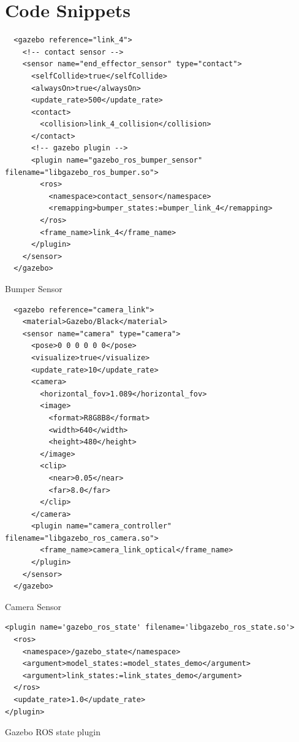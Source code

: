 \documentclass[12pt,oneside]{article}
\begin{document}
\clearpage



\appendix
\section{Code Snippets}
\begin{listing}[htbp]
\begin{verbatim} 
  <gazebo reference="link_4">
    <!-- contact sensor -->
    <sensor name="end_effector_sensor" type="contact">
      <selfCollide>true</selfCollide>
      <alwaysOn>true</alwaysOn>
      <update_rate>500</update_rate>
      <contact>
        <collision>link_4_collision</collision>
      </contact>
      <!-- gazebo plugin -->
      <plugin name="gazebo_ros_bumper_sensor" filename="libgazebo_ros_bumper.so">
        <ros>
          <namespace>contact_sensor</namespace>
          <remapping>bumper_states:=bumper_link_4</remapping>
        </ros>
        <frame_name>link_4</frame_name>
      </plugin>
    </sensor>
  </gazebo>
\end{verbatim}
\caption{Bumper Sensor}
\label{bumperSensorXml}
\end{listing}

\begin{listing}[htbp]
\begin{verbatim} 
  <gazebo reference="camera_link">
    <material>Gazebo/Black</material>
    <sensor name="camera" type="camera">
      <pose>0 0 0 0 0 0</pose>
      <visualize>true</visualize>
      <update_rate>10</update_rate>
      <camera>
        <horizontal_fov>1.089</horizontal_fov>
        <image>
          <format>R8G8B8</format>
          <width>640</width>
          <height>480</height>
        </image>
        <clip>
          <near>0.05</near>
          <far>8.0</far>
        </clip>
      </camera>
      <plugin name="camera_controller" filename="libgazebo_ros_camera.so">
        <frame_name>camera_link_optical</frame_name>
      </plugin>
    </sensor>
  </gazebo>
\end{verbatim}
\caption{Camera Sensor}
\label{cameraSensorXml}
\end{listing}

\begin{listing}[htbp]
\begin{verbatim} 
<plugin name='gazebo_ros_state' filename='libgazebo_ros_state.so'>
  <ros>
    <namespace>/gazebo_state</namespace>
    <argument>model_states:=model_states_demo</argument>
    <argument>link_states:=link_states_demo</argument>
  </ros>
  <update_rate>1.0</update_rate>
</plugin>
\end{verbatim}
\caption{Gazebo ROS state plugin}
\label{gazeboRosStatePluginXml}
\end{listing}
\end{document}

